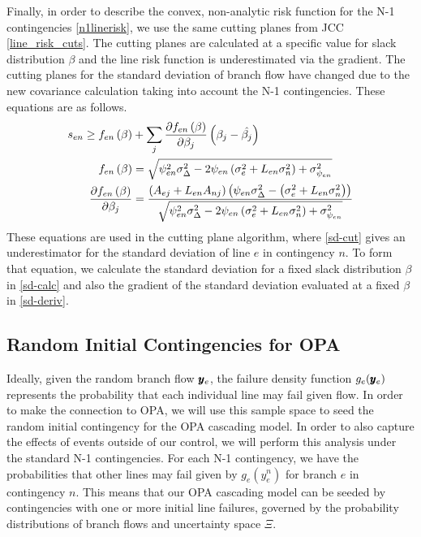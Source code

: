 Finally, in order to describe the convex, non-analytic risk function for the N-1 contingencies \cref{n1linerisk}, we use the same cutting planes from JCC \cref{line_risk_cuts}.  The cutting planes are calculated at a specific value for slack distribution $\beta$ and the line risk function is underestimated via the gradient.  The cutting planes for the standard deviation of branch flow have changed due to the new covariance calculation taking into account the N-1 contingencies.  These equations are as follows.
\begin{subequations}
\begin{align}
s_{en} \geq f_{en}\left(\beta\right) &+ \sum_j \frac{\partial f_{en}\left(\beta \right)}{\partial \beta_j} \left( \beta_j - \hat{\beta_j} \right) \label{sd-cut}\\
f_{en}\left(\beta\right) &= \sqrt{ \psi_{en}^2 \sigma_\Delta^2 - 2 \psi_{en} \left( \sigma_e^2 + L_{en} \sigma_n^2 \right) + \sigma^2_{\psi_{en}}} \label{sd-calc}\\
  \frac{\partial f_{en}\left(\beta \right)}{\partial \beta_j} &= \frac{\left(A_{ej} + L_{en}A_{nj}\right) \left( \psi_{en} \sigma_\Delta^2 - \left(\sigma_e^2 + L_{en} \sigma_n^2 \right) \right)}{\sqrt{\psi_{en}^2 \sigma_\Delta^2 - 2 \psi_{en} \left(\sigma_e^2  + L_{en}\sigma_n^2 \right) + \sigma^2_{\psi_{en}} }} \label{sd-deriv}
\end{align}
\end{subequations}
These equations are used in the cutting plane algorithm, where  \cref{sd-cut} gives an underestimator for the standard deviation of line $e$ in contingency $n$.  To form that equation, we calculate the standard deviation for a fixed slack distribution $\beta$ in \cref{sd-calc} and also the gradient of the standard deviation evaluated at a fixed $\beta$ in \cref{sd-deriv}.




\subsection{Random Initial Contingencies for OPA}
Ideally, given the random branch flow $\pmb{y}_e$, the failure density function $g_e(\pmb{y}_e)$ represents the probability that each individual line may fail given flow.  In order to make the connection to OPA, we will use this sample space to seed the random initial contingency for the OPA cascading model.  In order to also capture the effects of events outside of our control, we will perform this analysis under the standard N-1 contingencies.  For each N-1 contingency, we have the probabilities that other lines may fail given by $g_e(y_e^n)$ for branch $e$ in contingency $n$.  This means that our OPA cascading model can be seeded by contingencies with one or more initial line failures, governed by the probability distributions of branch flows and uncertainty space $\Xi$.  

